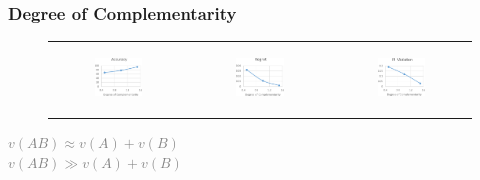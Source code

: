 \documentclass{beamer}
\begin{document}
\begin{frame}
	\frametitle{Degree of Complementarity}		
	\begin{figure}[!ht]
		\begin{tabular}{c c c}
			\begin{subfigure}{0.3\textwidth}
				\begin{center}
					\includegraphics[width=38mm]{res/degComplementarity_accuracy-cropped.pdf}
				\end{center}
			\end{subfigure} &
			\begin{subfigure}{0.3\textwidth}
				\includegraphics[width=38mm]{res/degComplementarity_regret-cropped.pdf}
			\end{subfigure} &
			\begin{subfigure}{0.3\textwidth}
				\includegraphics[width=38mm]{res/degComplementarity_ir-violation-cropped.pdf}
			\end{subfigure}
		\end{tabular}
	\end{figure}

\bigskip\bigskip
{\small\textcolor{gray}{
		 $v(AB)  \approx v(A) + v(B)$\\
		 $v(AB)  \gg v(A) + v(B)$
}}
\end{frame}
\end{document}
